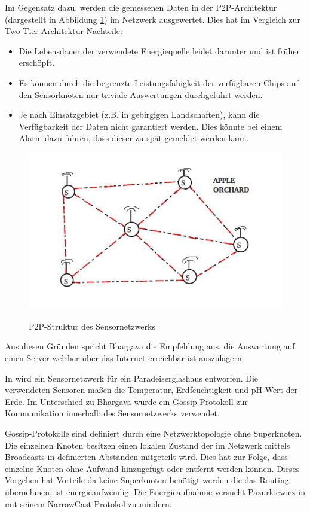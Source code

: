 Im Gegensatz dazu, werden die gemessenen Daten in der P2P-Architektur (dargestellt in Abbildung \ref{fig:p2p_architecture_img}) im Netzwerk ausgewertet. Dies hat im Vergleich zur Two-Tier-Architektur Nachteile:
\begin{itemize}
	\item Die Lebensdauer der verwendete Energiequelle leidet darunter und ist früher erschöpft.
	\item Es können durch die begrenzte Leistungsfähigkeit der verfügbaren Chips auf den Sensorknoten nur triviale Auswertungen durchgeführt werden.
	\item Je nach Einsatzgebiet (z.B. in gebirgigen Landschaften), kann die Verfügbarkeit der Daten nicht garantiert werden. Dies könnte bei einem Alarm dazu führen, dass dieser zu spät gemeldet werden kann.
\end{itemize}

\begin{figure}[h]
 \includegraphics[scale=0.75,natwidth=\textwidth]{figures/sensors/p2p_architecture.png}
 \centering
 \label{fig:p2p_architecture_img}
 \caption{P2P-Struktur des Sensornetzwerks \cite{jour:Bhargava2014}}
\end{figure}

Aus diesen Gründen spricht Bhargava die Empfehlung aus, die Auswertung auf einen Server welcher über das Internet erreichbar ist auszulagern.

In \cite{jour:Srbinovska2014} wird ein Sensornetzwerk für ein Paradeiserglashaus entworfen. Die verwendeten Sensoren maßen die Temperatur, Erdfeuchtigkeit und pH-Wert der Erde. Im Unterschied zu Bhargava wurde ein Gossip-Protokoll zur Kommunikation innerhalb des Sensornetzwerks verwendet.

Gossip-Protokolle sind definiert durch eine Netzwerktopologie ohne Superknoten. Die einzelnen Knoten besitzen einen lokalen Zustand der im Netzwerk mittels Broadcasts in definierten Abständen mitgeteilt wird. Dies hat zur Folge, dass einzelne Knoten ohne Aufwand hinzugefügt oder entfernt werden können. Dieses Vorgehen hat Vorteile da keine Superknoten benötigt werden die das Routing übernehmen, ist energieaufwendig. Die Energieaufnahme versucht Pazurkiewicz in \cite{jour:Pazurkiewicz2014} mit seinem NarrowCast-Protokol zu mindern.


